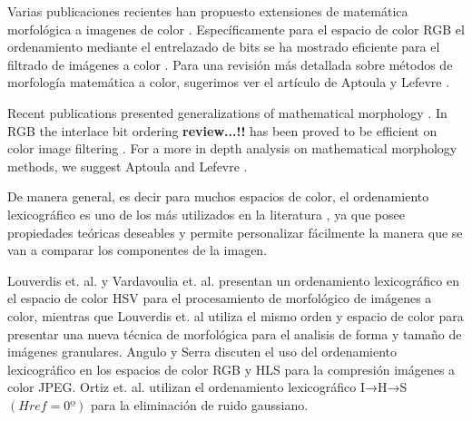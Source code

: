 Varias publicaciones recientes han propuesto extensiones de matemática morfológica a imagenes de color \cite{ledoux2012limits, van2013group, velasco2012random, lezoray2009learning, velasco2010morphological, burgeth2013morphology, velasco2011supervised, hanbury2001morphological, angulo2010pseudo, aptoula2008alpha, kleefeld2015processing, vazquez2014color}. Espec\'ificamente para el espacio de color RGB el ordenamiento mediante el entrelazado de bits se ha mostrado eficiente para el filtrado de im\'agenes a color \cite{chanussot1997bit}. Para una revisión más detallada sobre métodos de morfología matemática a color, sugerimos ver el artículo de Aptoula y Lefevre \cite{aptoula2007comparative}.

Recent publications presented generalizations of mathematical morphology \cite{ledoux2012limits, van2013group, velasco2012random, lezoray2009learning, velasco2010morphological, burgeth2013morphology, velasco2011supervised, hanbury2001morphological, angulo2010pseudo, aptoula2008alpha, kleefeld2015processing, vazquez2014color}. In RGB the interlace bit ordering \textbf{review...!!} has been proved to be efficient on color image filtering \cite{chanussot1997bit}. For a more in depth analysis on mathematical morphology methods, we suggest Aptoula and Lefevre \cite{apatoula2007comparative}.



De manera general, es decir para muchos espacios de color, el ordenamiento lexicogr\'afico es  uno de los m\'as utilizados en la literatura \cite{aptoula2007comparative, aptoula2008lexicographical}, ya que posee propiedades te\'oricas deseables y permite personalizar f\'acilmente la manera que se van a comparar los componentes de la imagen. 

Louverdis et. al. \cite{louverdis2002new} y  Vardavoulia et. al. \cite{vardavoulia2002vector} presentan un ordenamiento lexicográfico en el espacio de color HSV para el procesamiento de morfológico de imágenes a color, mientras que Louverdis et. al \cite{louverdis2002morphological} utiliza el mismo orden y espacio de color para presentar una nueva técnica de morfológica para el analisis de forma y tamaño de imágenes granulares. Angulo y Serra \cite{angulo2003morphological} discuten el uso del ordenamiento lexicográfico en los espacios de color RGB y HLS para la compresión imágenes a color JPEG. Ortiz et. al. \cite{ortiz2004gaussian}  utilizan el ordenamiento lexicográfico I→H→S $(Href=0º)$ para la eliminación de ruido gaussiano. 

